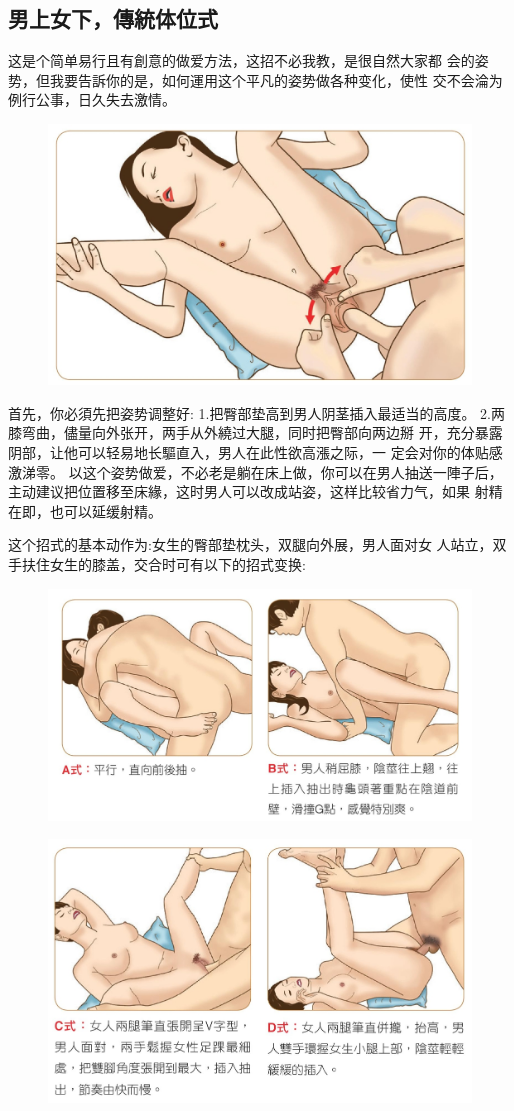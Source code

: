 \documentclass[12pt,UTF8]{ctexbook}
\begin{document}
\subsection{男上女下，傳統体位式}

这是个简单易行且有創意的做爱方法，这招不必我教，是很自然大家都
会的姿势，但我要告訴你的是，如何運用这个平凡的姿势做各种变化，使性
交不会淪为例行公事，日久失去激情。

\begin{figure}[htbp]
	\centering
	\includegraphics[width=0.7\linewidth]{28}
	\caption{}
	\label{fig:1}
\end{figure}

首先，你必須先把姿势调整好:
1.把臀部垫高到男人阴茎插入最适当的高度。
2.两膝弯曲，儘量向外张开，两手从外繞过大腿，同时把臀部向两边掰
开，充分暴露阴部，让他可以轻易地长驅直入，男人在此性欲高漲之际，一
定会对你的体贴感激涕零。
以这个姿势做爱，不必老是躺在床上做，你可以在男人抽送一陣子后，
主动建议把位置移至床緣，这时男人可以改成站姿，这样比较省力气，如果
射精在即，也可以延缓射精。

这个招式的基本动作为:女生的臀部垫枕头，双腿向外展，男人面对女
人站立，双手扶住女生的膝盖，交合时可有以下的招式变换:

\begin{figure}[htbp]
	\centering
	\includegraphics[width=0.7\linewidth]{29}
	\caption{}
	\label{fig:1}
\end{figure}

\begin{figure}[htbp]
	\centering
	\includegraphics[width=0.7\linewidth]{30}
	\caption{}
	\label{fig:1}
\end{figure}
\end{document}
